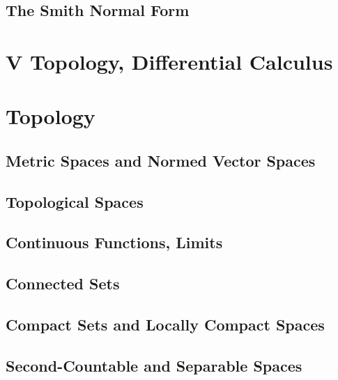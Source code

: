\documentclass[a4paper]{article}
\begin{document}
\subsection{ The Smith Normal Form} %


\newpage
\section*{V Topology, Differential Calculus}
\section{Topology}
\subsection{ Metric Spaces and Normed Vector Spaces} %

\subsection{ Topological Spaces} %

\subsection{ Continuous Functions, Limits} %

\subsection{ Connected Sets} %

\subsection{ Compact Sets and Locally Compact Spaces} %

\subsection{ Second-Countable and Separable Spaces} %
\end{document}
